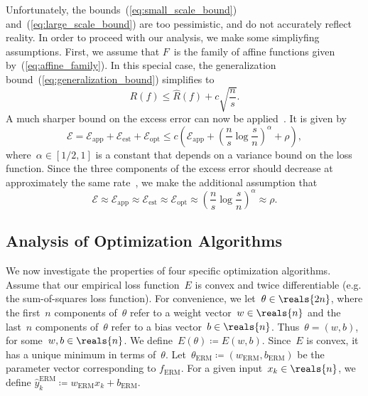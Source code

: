 \documentclass[11pt,a4paper]{article}
\numberwithin{equation}{section}
\newcommand{\apperr}{\mathcal{E}_{\mathrm{app}}}
\newcommand{\esterr}{\mathcal{E}_{\mathrm{est}}}
\newcommand{\opterr}{\mathcal{E}_{\mathrm{opt}}}
\begin{document}
Unfortunately, the bounds~(\ref{eq:small_scale_bound})
and~(\ref{eq:large_scale_bound}) are too pessimistic, and do not accurately
reflect reality. In order to proceed with our analysis, we make some simpliyfing
assumptions. First, we assume that $F$~is the family of affine functions given
by~(\ref{eq:affine_family}). In this special case, the generalization
bound~(\ref{eq:generalization_bound}) simplifies to
\[
	R(f) \leq \hat{R}(f) + c \sqrt{\frac{n}{s}}.
\]
A much sharper bound on the excess error can now be
applied~\citep{bousquet2008tradeoffs}. It is given by
\begin{equation}
	\mathcal{E}
	= \apperr + \esterr + \opterr
	\leq c \left( \apperr + \left(\frac{n}{s}\log\frac{s}{n}\right)^\alpha +
		\rho \right),
	\label{eq:fast_rate_bound}
\end{equation}
where~$\alpha \in [1/2, 1]$ is a constant that depends on a variance bound on
the loss function. Since the three components of the excess error should
decrease at approximately the same rate~\citep{bousquet2008tradeoffs}, we make
the additional assumption that
\begin{equation}
	\mathcal{E} \approx \apperr \approx \esterr \approx \opterr \approx
		\left(\frac{n}{s}\log\frac{s}{n}\right)^\alpha \approx \rho.
	\label{eq:error_equiv}
\end{equation}

\subsection{Analysis of Optimization Algorithms}

We now investigate the properties of four specific optimization algorithms.
Assume that our empirical loss function~$E$ is convex and twice differentiable
(e.g. the sum-of-squares loss function). For convenience, we let~$\theta \in
\reals{2n}$, where the first~$n$ components of~$\theta$ refer to a weight
vector~$w \in \reals{n}$ and the last~$n$ components of~$\theta$ refer to a bias
vector~$b \in \reals{n}$. Thus~$\theta = (w, b)$, for some~$w, b \in \reals{n}$.
We define~$E(\theta) \coloneqq E(w, b)$. Since~$E$ is convex, it has a unique
minimum in terms of~$\theta$. Let~$\theta_{\text{ERM}} \coloneqq
(w_{\text{ERM}}, b_{\text{ERM}})$ be the parameter vector corresponding to
$f_{\text{ERM}}$. For a given input~$x_k \in \reals{n}$, we define
$\hat{y}_k^{\text{ERM}} \coloneqq w_{\text{ERM}} x_k + b_{\text{ERM}}$.
\end{document}
